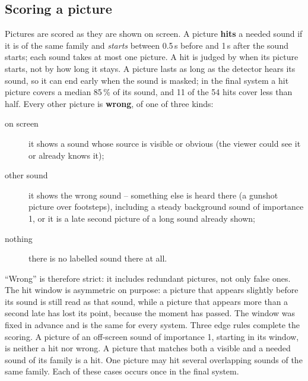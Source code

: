 \subsection{Scoring a picture}\label{sec:matching}
Pictures are scored as they are shown on screen. A picture \textbf{hits} a needed sound if it is of the same family
and \emph{starts} between 0.5\,s before and 1\,s after the sound starts; each sound takes at most one picture. A hit
is judged by when its picture starts, not by how long it stays. A picture lasts as long as the detector hears its sound, so it
can end early when the sound is masked; in the final system a hit picture covers a median 85\,\% of its sound, and 11 of
the 54 hits cover less than half. Every
other picture is \textbf{wrong}, of one of three kinds:
\begin{description}
  \item[on screen] it shows a sound whose source is visible or obvious (the viewer could see it or already knows it);
  \item[other sound] it shows the wrong sound -- something else is heard there (a gunshot picture over footsteps),
        including a steady background sound of importance 1, or it is a late second picture of a long sound already
        shown;
  \item[nothing] there is no labelled sound there at all.
\end{description}
``Wrong'' is therefore strict: it includes redundant pictures, not only false ones. The hit window is asymmetric on
purpose: a picture that appears slightly before its sound is still read as that sound, while a picture that appears
more than a second late has lost its point, because the moment has passed. The window was fixed in advance and is the
same for every system. Three edge rules complete the scoring. A picture of an off-screen sound of importance 1,
starting in its window, is neither a hit nor wrong. A picture that matches both a visible and a needed sound of its
family is a hit. One picture may hit several overlapping sounds of the same family. Each of these cases occurs once in
the final system.

